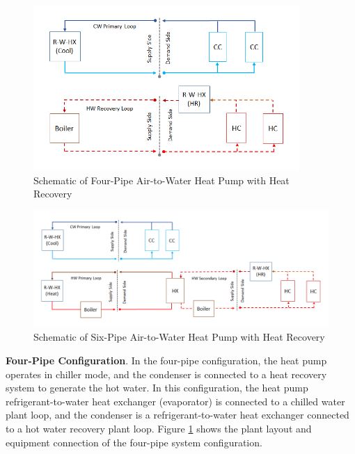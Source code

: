 \begin{figure}[hbtp] %
    \centering
    \includegraphics[width=0.9\textwidth, height=0.9\textheight, keepaspectratio=true]{media/FourPipe_HeatRecoveryPlantConfig.png}
    \caption{Schematic of Four-Pipe Air-to-Water Heat Pump with Heat Recovery \protect \label{fig:schematic-of-four-pipe-air-to-water-heat-pump-with-heat-recovery}}
\end{figure}

\begin{figure}[hbtp] %
    \centering
    \includegraphics[width=1.0\textwidth, height=0.9\textheight, keepaspectratio=true]{media/SixPipe_HeatRecoveryPlantConfig.png}
    \caption{Schematic of Six-Pipe Air-to-Water Heat Pump with Heat Recovery \protect \label{fig:schematic-of-six-pipe-air-to-water-heat-pump-with-heat-recovery}}
\end{figure}


\textbf{Four-Pipe Configuration}. In the four-pipe configuration, the heat pump operates in chiller mode, and the condenser is connected to a heat recovery system to generate the hot water. In this configuration, the heat pump refrigerant-to-water heat exchanger (evaporator) is connected to a chilled water plant loop, and the condenser is a refrigerant-to-water heat exchanger connected to a hot water recovery plant loop. Figure \ref{fig:schematic-of-four-pipe-air-to-water-heat-pump-with-heat-recovery} shows the plant layout and equipment connection of the four-pipe system configuration.

